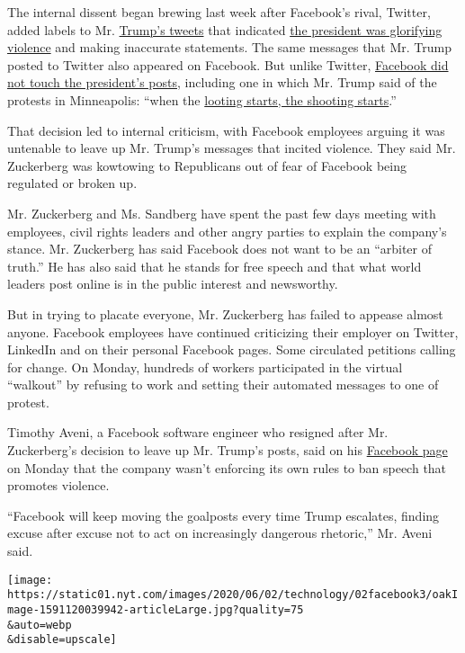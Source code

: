 The internal dissent began brewing last week after Facebook's rival,
Twitter, added labels to Mr.
\href{https://www.nytimes.com/2020/06/03/us/politics/trump-twitter-fact-check.html}{Trump's
tweets} that indicated
\href{https://www.nytimes.com/2020/05/29/technology/trump-twitter-minneapolis-george-floyd.html}{the
president was glorifying violence} and making inaccurate statements. The
same messages that Mr. Trump posted to Twitter also appeared on
Facebook. But unlike Twitter,
\href{https://www.nytimes.com/2020/05/29/technology/twitter-facebook-zuckerberg-trump.html}{Facebook
did not touch the president's posts}, including one in which Mr. Trump
said of the protests in Minneapolis: ``when the
\href{https://www.nytimes.com/2020/05/29/us/looting-starts-shooting-starts.html}{looting
starts, the shooting starts}.''

That decision led to internal criticism, with Facebook employees arguing
it was untenable to leave up Mr. Trump's messages that incited violence.
They said Mr. Zuckerberg was kowtowing to Republicans out of fear of
Facebook being regulated or broken up.

Mr. Zuckerberg and Ms. Sandberg have spent the past few days meeting
with employees, civil rights leaders and other angry parties to explain
the company's stance. Mr. Zuckerberg has said Facebook does not want to
be an ``arbiter of truth.'' He has also said that he stands for free
speech and that what world leaders post online is in the public interest
and newsworthy.

But in trying to placate everyone, Mr. Zuckerberg has failed to appease
almost anyone. Facebook employees have continued criticizing their
employer on Twitter, LinkedIn and on their personal Facebook pages. Some
circulated petitions calling for change. On Monday, hundreds of workers
participated in the virtual ``walkout'' by refusing to work and setting
their automated messages to one of protest.

Timothy Aveni, a Facebook software engineer who resigned after Mr.
Zuckerberg's decision to leave up Mr. Trump's posts, said on his
\href{https://www.facebook.com/timothy.j.aveni/posts/3006224359465567}{Facebook
page} on Monday that the company wasn't enforcing its own rules to ban
speech that promotes violence.

``Facebook will keep moving the goalposts every time Trump escalates,
finding excuse after excuse not to act on increasingly dangerous
rhetoric,'' Mr. Aveni said.

\texttt{[image: https://static01.nyt.com/images/2020/06/02/technology/02facebook3/oakImage-1591120039942-articleLarge.jpg?quality=75\\\&auto=webp\\\&disable=upscale]}

